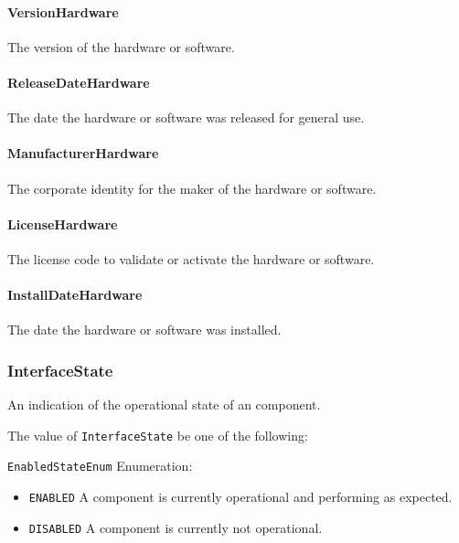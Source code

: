 \paragraph{VersionHardware}\mbox{}
\label{sec:VersionHardware}


The version of the hardware or software.


\paragraph{ReleaseDateHardware}\mbox{}
\label{sec:ReleaseDateHardware}


The date the hardware or software was released for general use.



\paragraph{ManufacturerHardware}\mbox{}
\label{sec:ManufacturerHardware}


The corporate identity for the maker of the hardware or software.



\paragraph{LicenseHardware}\mbox{}
\label{sec:LicenseHardware}


The license code to validate or activate the hardware or software.


\paragraph{InstallDateHardware}\mbox{}
\label{sec:InstallDateHardware}


The date the hardware or software was installed.


\subsubsection{InterfaceState}




An indication of the operational state of an  component.


The value of \texttt{InterfaceState} \MUST be one of the following: 


\texttt{EnabledStateEnum} Enumeration:

\begin{itemize}
\item \texttt{ENABLED} \newline A component is currently operational and performing as expected. 
\item \texttt{DISABLED} \newline A component is currently not operational. 
\end{itemize}

